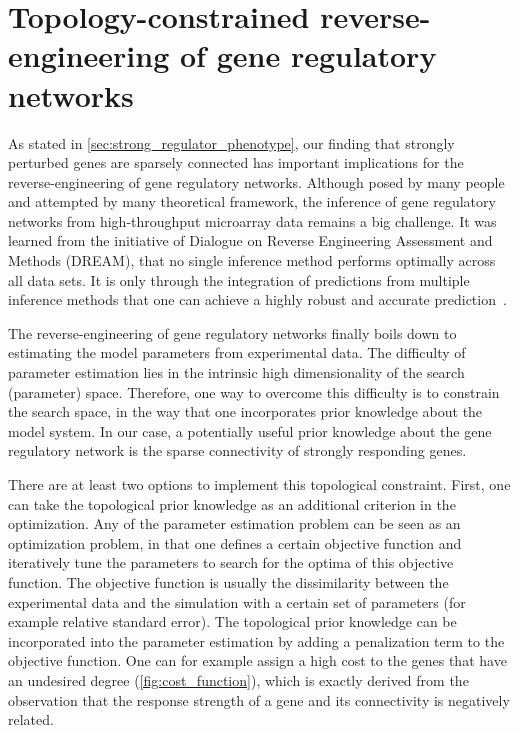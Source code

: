 \section{Topology-constrained reverse-engineering of gene regulatory networks}
As stated in \ref{sec:strong_regulator_phenotype}, our finding that strongly perturbed 
genes are sparsely connected has important implications for the reverse-engineering
of gene regulatory networks. Although posed by many people and attempted by 
many theoretical framework, the inference of gene regulatory networks from 
high-throughput microarray data remains a big challenge. It was learned from
the initiative of Dialogue on Reverse Engineering Assessment and Methods (DREAM),
that no single inference method performs optimally across all data sets. 
It is only through the integration of predictions from multiple inference methods 
that one can achieve a highly robust and accurate prediction~\citep{Marbach2012}.

The reverse-engineering of gene regulatory networks finally boils down to 
estimating the model parameters from experimental data. The difficulty of
parameter estimation lies in the intrinsic high dimensionality of the search
(parameter) space. Therefore, one way to overcome this difficulty is to 
constrain the search space, in the way that one incorporates prior knowledge
about the model system. In our case, a potentially useful prior knowledge
about the gene regulatory network is the sparse connectivity of strongly 
responding genes.

There are at least two options to implement this topological constraint. 
First, one can take the topological prior knowledge as an additional
criterion in the optimization. Any of the parameter estimation problem
can be seen as an optimization problem, in that one defines a certain
objective function and iteratively tune the parameters to search for
the optima of this objective function. The objective function is usually the 
dissimilarity between the experimental data and the simulation with a certain
set of parameters (for example
relative standard error). The topological prior knowledge can be incorporated
into the parameter estimation by adding a penalization term to the
objective function.
One can for example
assign a high cost to the genes that have an undesired degree (\ref{fig:cost_function}), 
which is exactly derived 
from the observation that the response strength of a gene and its connectivity
is negatively related.

